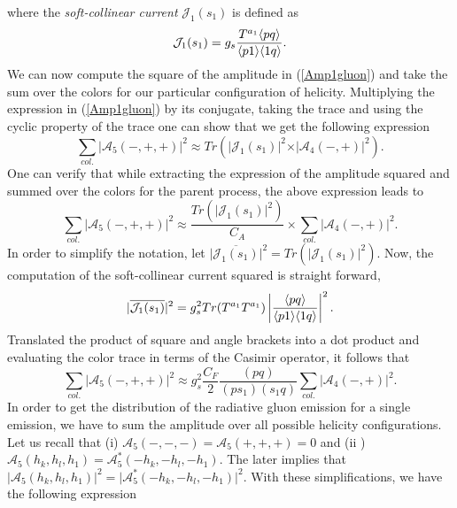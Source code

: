 where the \emph{soft-collinear current} $\mathcal{J}_1(s_1)$ is defined as
\begin{equation}
\mathcal{J}_1(s_1)=g_s \frac{T^{a_1} \langle pq\rangle}{\langle p1\rangle \langle1q\rangle}.
\end{equation}
We can now compute the square of the amplitude in (\ref{Amp1gluon}) and take the sum over the colors for our particular configuration of helicity. Multiplying the expression in (\ref{Amp1gluon}) by its conjugate, taking the trace and using the cyclic property of the trace one can show that we get the following expression
\begin{equation}
\sum_{col.} \vert \mathcal{A}_5(-,+,+) \vert^2 \approx Tr\left( \vert \mathcal{J}_1(s_1) \vert^2 \times \vert \mathcal{A}_4(-,+)\vert^2 \right).
\end{equation}  
One can verify that while extracting the expression of the amplitude squared and summed over the colors for the parent process, the above expression leads to 
\begin{equation}
\sum_{col.} \vert \mathcal{A}_5(-,+,+) \vert^2 \approx \frac{Tr\left( \vert \mathcal{J}_1(s_1)\vert^2 \right)}{C_A} \times \sum_{col.} \vert \mathcal{A}_4(-,+)\vert^2.
\end{equation}
In order to simplify the notation, let $\vert \overline{\mathcal{J}_1(s_1)} \vert^2=Tr\left( \vert \mathcal{J}_1(s_1)\vert^2\right)$. Now, the computation of the soft-collinear current squared is straight forward,
\begin{equation}
\vert \overline{\mathcal{J}_1(s_1)} \vert^2=g^2_s Tr(T^{a_1}T^{a_1}) \left| \frac{\langle p q\rangle}{\langle p 1\rangle \langle1 q\rangle} \right|^2.
\end{equation}
Translated the product of square and angle brackets into a dot product and evaluating the color trace in terms of the Casimir operator, it follows that 
\begin{equation}
\sum_{col.} \vert \mathcal{A}_5(-,+,+) \vert^2 \approx g^2_s \frac{C_F}{2} \frac{(p q)}{(p s_1) (s_1 q)} \sum_{col.} \vert \mathcal{A}_4(-,+)\vert^2.
\end{equation}
In order to get the distribution of the radiative gluon emission for a single emission, we have to sum the amplitude over all possible helicity configurations. Let us recall that (i) $\mathcal{A}_5(-,-,-)= \mathcal{A}_5(+,+,+)=0$ and (ii ) $\mathcal{A}_5(h_k,h_l,h_1)= \mathcal{A}^*_5(-h_k,-h_l,-h_1)$. The later implies that $\vert \mathcal{A}_5(h_k,h_l,h_1) \vert^2= \vert \mathcal{A}^*_5(-h_k,-h_l,-h_1)\vert^2$. With these simplifications, we have the following expression
